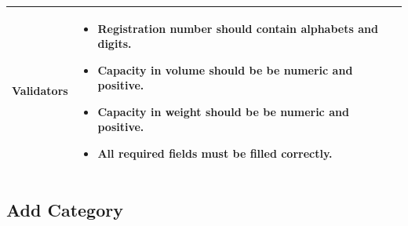\documentclass[12pt,a4paper]{article}
\begin{document}
\begin{longtable}{| p{3cm}|p{12cm}|}
Validators & 
\begin{itemize}
\item   Registration number should contain alphabets and digits.
\item  Capacity in volume should be be numeric and positive. 
\item Capacity in weight should be be numeric and positive. 
\item All required fields must be filled correctly. 

\end{itemize}
\\ \hline
\end{longtable}
\subsection{Add Category}
\end{document}
